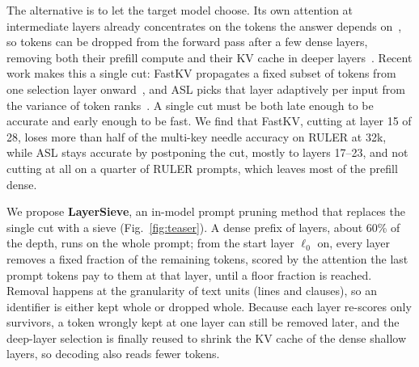 \documentclass[10pt,conference]{IEEEtran}
\begin{document}
The alternative is to let the target model choose. Its own attention at intermediate layers already concentrates on the tokens the answer depends on~\cite{li2024snapkv,shi2024gemfilter}, so tokens can be dropped from the forward pass after a few dense layers, removing both their prefill compute and their KV cache in deeper layers~\cite{fu2024lazyllm,long2026sliminfer}. Recent work makes this a single cut: FastKV propagates a fixed subset of tokens from one selection layer onward~\cite{jo2026fastkv}, and ASL picks that layer adaptively per input from the variance of token ranks~\cite{taniguchi2026asl}. A single cut must be both late enough to be accurate and early enough to be fast. We find that FastKV, cutting at layer 15 of 28, loses more than half of the multi-key needle accuracy on RULER at 32k, while ASL stays accurate by postponing the cut, mostly to layers 17--23, and not cutting at all on a quarter of RULER prompts, which leaves most of the prefill dense.

We propose \textbf{LayerSieve}, an in-model prompt pruning method that replaces the single cut with a sieve (Fig.~\ref{fig:teaser}). A dense prefix of layers, about 60\% of the depth, runs on the whole prompt; from the start layer $\ell_0$ on, every layer removes a fixed fraction of the remaining tokens, scored by the attention the last prompt tokens pay to them at that layer, until a floor fraction is reached. Removal happens at the granularity of text units (lines and clauses), so an identifier is either kept whole or dropped whole. Because each layer re-scores only survivors, a token wrongly kept at one layer can still be removed later, and the deep-layer selection is finally reused to shrink the KV cache of the dense shallow layers, so decoding also reads fewer tokens.
\end{document}
